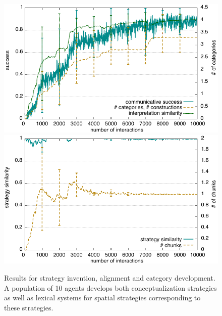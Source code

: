 \begin{figure}
\begin{center}
\includegraphics[width=0.9\columnwidth]{figs/chunk-alignment-category-invention-success}
\includegraphics[width=0.9\columnwidth]{figs/chunk-alignment-category-invention-alignment}
\end{center}
\caption[Results for strategy invention, alignment and category development]{%
Results for strategy invention, alignment and category development. A population
of 10 agents develops both conceptualization strategies as well as lexical systems for 
spatial strategies corresponding to these strategies.}
\label{f:strategy-invention-dynamics}
\end{figure}



